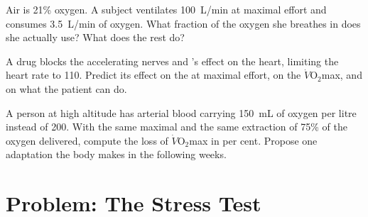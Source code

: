 \begin{exercise}[$\star\star\star$]\label{exo:g10:heart-lungs-effort:13}
Air is 21\% oxygen. A subject ventilates \qty{100}{L/min} at maximal
effort and consumes \qty{3.5}{L/min} of oxygen. What fraction of the
oxygen she breathes in does she actually use? What does the rest do?
\end{exercise}

\begin{exercise}[$\star\star\star$]\label{exo:g10:heart-lungs-effort:14}
A drug blocks the accelerating nerves and 's effect on the
heart, limiting the heart rate to 110. Predict its effect on the
 at maximal effort, on the $\dot V\!\mathrm{O_2}$max,
and on what the patient can do.
\end{exercise}

\begin{exercise}[$\star\star\star$]\label{exo:g10:heart-lungs-effort:15}
A person at high altitude has arterial blood carrying \qty{150}{mL} of
oxygen per litre instead of \num{200}. With the same maximal  and the same extraction of 75\% of the oxygen delivered,
compute the loss of $\dot V\!\mathrm{O_2}$max in per cent. Propose one
adaptation the body makes in the following weeks.
\end{exercise}

\section{Problem: The Stress Test}

